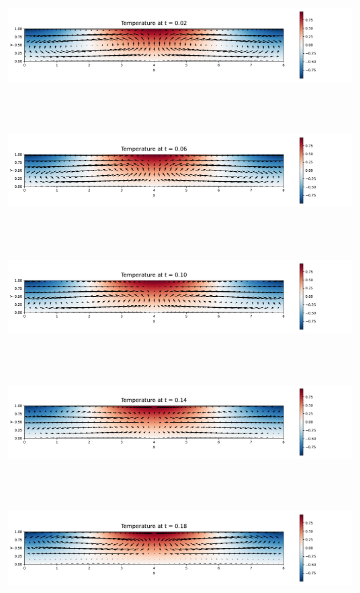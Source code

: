 \documentclass{article}
\begin{document}
\begin{figure}[ht]
  \centering
  \begin{subfigure}{\textwidth}
    \centering
    \includegraphics[width=\textwidth]{images/TS_1.pdf}
  \end{subfigure}\\
  \begin{subfigure}{\textwidth}
    \centering
    \includegraphics[width=\textwidth]{images/TS_2.pdf}
  \end{subfigure}\\
  \begin{subfigure}{\textwidth}
    \centering
    \includegraphics[width=\textwidth]{images/TS_3.pdf}
  \end{subfigure}\\
  \begin{subfigure}{\textwidth}
    \centering
    \includegraphics[width=\textwidth]{images/TS_4.pdf}
  \end{subfigure}\\
  \begin{subfigure}{\textwidth}
    \centering
    \includegraphics[width=\textwidth]{images/TS_5.pdf}

\end{subfigure}
\end{figure}
\end{document}

